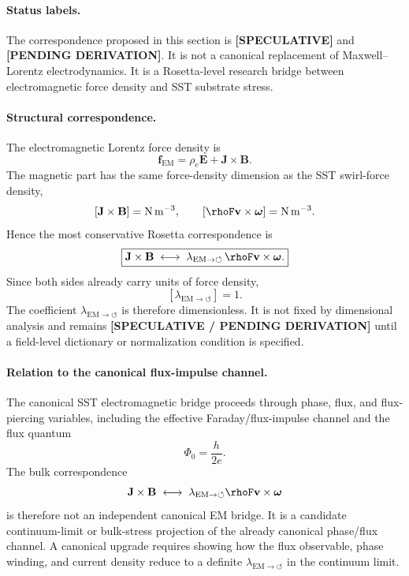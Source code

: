 \paragraph{Status labels.}
The correspondence proposed in this section is \textbf{[SPECULATIVE]} and
\textbf{[PENDING DERIVATION]}.  It is not a canonical replacement of
Maxwell--Lorentz electrodynamics.  It is a Rosetta-level research bridge
between electromagnetic force density and SST substrate stress.

\paragraph{Structural correspondence.}
The electromagnetic Lorentz force density is
\[
\mathbf f_{\mathrm{EM}}
=
\rho_e\mathbf E+\mathbf J\times\mathbf B .
\]
The magnetic part has the same force-density dimension as the SST
swirl-force density,
\[
[\mathbf J\times\mathbf B]
=
\mathrm{N\,m^{-3}},
\qquad
[\rhoF\mathbf v\times\boldsymbol{\omega}]
=
\mathrm{N\,m^{-3}}.
\]
Hence the most conservative Rosetta correspondence is
\[
\boxed{
\mathbf J\times\mathbf B
\;\longleftrightarrow\;
\lambda_{\mathrm{EM}\to\circlearrowleft}\,
\rhoF\mathbf v\times\boldsymbol{\omega}.
}
\]
Since both sides already carry units of force density,
\[
\boxed{
[\lambda_{\mathrm{EM}\to\circlearrowleft}]=1 .
}
\]
The coefficient
\(\lambda_{\mathrm{EM}\to\circlearrowleft}\) is therefore dimensionless.
It is not fixed by dimensional analysis and remains
\textbf{[SPECULATIVE / PENDING DERIVATION]} until a field-level dictionary or
normalization condition is specified.

\paragraph{Relation to the canonical flux-impulse channel.}
The canonical SST electromagnetic bridge proceeds through phase, flux, and
flux-piercing variables, including the effective Faraday/flux-impulse
channel and the flux quantum
\[
\Phi_0=\frac{h}{2e}.
\]
The bulk correspondence
\[
\mathbf J\times\mathbf B
\;\longleftrightarrow\;
\lambda_{\mathrm{EM}\to\circlearrowleft}
\rhoF\mathbf v\times\boldsymbol{\omega}
\]
is therefore not an independent canonical EM bridge.  It is a candidate
continuum-limit or bulk-stress projection of the already canonical
phase/flux channel.  A canonical upgrade requires showing how the flux
observable, phase winding, and current density reduce to a definite
\(\lambda_{\mathrm{EM}\to\circlearrowleft}\) in the continuum limit.

